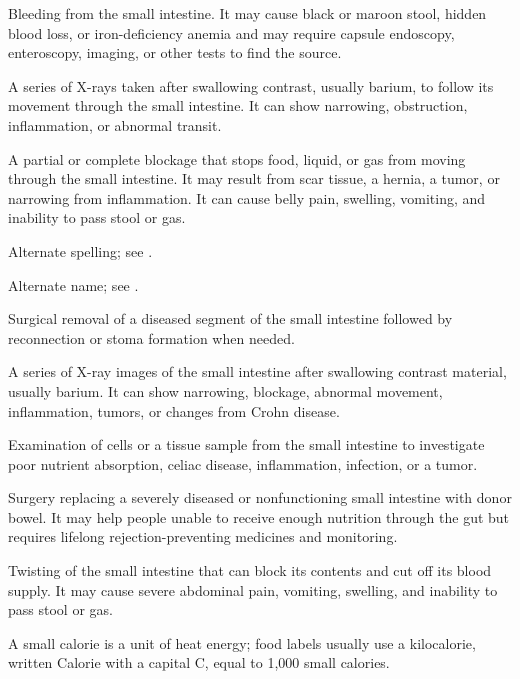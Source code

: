  Bleeding from the small intestine. It may cause black or maroon stool, hidden blood loss, or iron-deficiency anemia and may require capsule endoscopy, enteroscopy, imaging, or other tests to find the source.

 A series of X-rays taken after swallowing contrast, usually barium, to follow its movement through the small intestine. It can show narrowing, obstruction, inflammation, or abnormal transit.

 A partial or complete blockage that stops food, liquid, or gas from moving through the small intestine. It may result from scar tissue, a hernia, a tumor, or narrowing from inflammation. It can cause belly pain, swelling, vomiting, and inability to pass stool or gas.

 Alternate spelling; see .

 Alternate name; see .

 Surgical removal of a diseased segment of the small intestine followed by reconnection or stoma formation when needed.

 A series of X-ray images of the small intestine after swallowing contrast material, usually barium. It can show narrowing, blockage, abnormal movement, inflammation, tumors, or changes from Crohn disease.

 Examination of cells or a tissue sample from the small intestine to investigate poor nutrient absorption, celiac disease, inflammation, infection, or a tumor.

 Surgery replacing a severely diseased or nonfunctioning small intestine with donor bowel. It may help people unable to receive enough nutrition through the gut but requires lifelong rejection-preventing medicines and monitoring.

 Twisting of the small intestine that can block its contents and cut off its blood supply. It may cause severe abdominal pain, vomiting, swelling, and inability to pass stool or gas.

 A small calorie is a unit of heat energy; food labels usually use a kilocalorie, written Calorie with a capital C, equal to 1,000 small calories.

